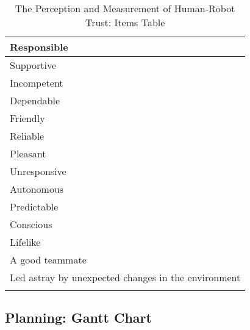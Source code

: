 \begin{longtable}{l}
	Responsible \\ \hline
	Supportive \\ \hline
	Incompetent \\ \hline
	Dependable \\ \hline
	Friendly \\ \hline
	Reliable \\ \hline
	Pleasant \\ \hline
	Unresponsive \\ \hline
	Autonomous \\ \hline
	Predictable \\ \hline
	Conscious \\ \hline
	Lifelike \\ \hline
	A good teammate \\ \hline
	Led astray by unexpected changes in the environment \\
	\caption{The Perception and Measurement of Human-Robot Trust: Items Table}
	\label{tbl:measurement.items.table}	
\end{longtable}

\newpage
\begin{landscape}
	\section{Planning: Gantt Chart}
	\label{app:Planning}	
	\begin{figure}        
		\centering 
	\end{figure}
\end{landscape}

